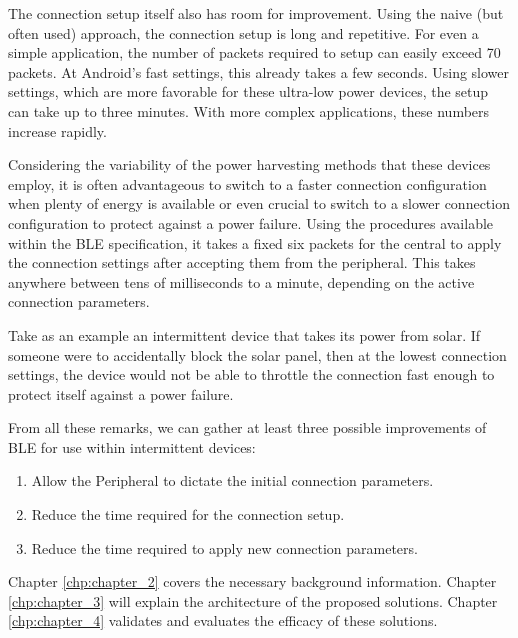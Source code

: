 The connection setup itself also has room for improvement. Using the naive (but often used) approach, the connection setup is long and repetitive. For even a simple application, the number of packets required to setup can easily exceed 70 packets. At Android's fast settings, this already takes a few seconds. Using slower settings, which are more favorable for these ultra-low power devices, the setup can take up to three minutes. With more complex applications, these numbers increase rapidly.

Considering the variability of the power harvesting methods that these devices employ, it is often advantageous to switch to a faster connection configuration when plenty of energy is available or even crucial to switch to a slower connection configuration to protect against a power failure. Using the procedures available within the BLE specification, it takes a fixed six packets for the central to apply the connection settings after accepting them from the peripheral. This takes anywhere between tens of milliseconds to a minute, depending on the active connection parameters. 

Take as an example an intermittent device that takes its power from solar. If someone were to accidentally block the solar panel, then at the lowest connection settings, the device would not be able to throttle the connection fast enough to protect itself against a power failure.

From all these remarks, we can gather at least three possible improvements of BLE for use within intermittent devices:
\begin{enumerate}
    \item Allow the Peripheral to dictate the initial connection parameters.
    \item Reduce the time required for the connection setup.
    \item Reduce the time required to apply new connection parameters.
\end{enumerate}
Chapter \ref*{chp:chapter_2} covers the necessary background information. Chapter \ref*{chp:chapter_3} will explain the architecture of the proposed solutions. Chapter \ref*{chp:chapter_4} validates and evaluates the efficacy of these solutions.

